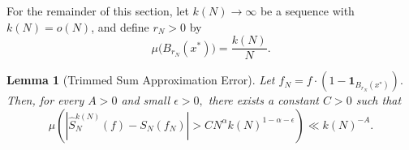 \documentclass[11pt,twoside,a4paper,reqno]{amsart}
\newtheorem{lemma}[theorem]{Lemma}
\def\one{{\mathbf{1}}}
\begin{document}
For the remainder of this section, let $k(N)\rightarrow \infty$ be a sequence with $k(N)=o(N)$, and define $r_N>0$ by
\begin{equation*}
\mu\bigl(B_{r_N}(x^*)\bigr)=\frac{k(N)}{N}.
\end{equation*}




\begin{lemma}[Trimmed Sum Approximation Error]\label{interTSAR}
Let $f_N=f \cdot \left(1 - \one_{B_{r_N}(x^*)} \right).$ Then, for every $A>0$ and small $\epsilon>0,$ there exists a constant $C>0$ such that
\begin{equation*}
\mu\left(\left| \hat{S}_N^{k(N)}(f) - S_N(f_N) \right|>C N^{\alpha} k(N)^{1-\alpha-\epsilon}\right) \ll k(N)^{-A}.
\end{equation*}
\end{lemma}
\end{document}
